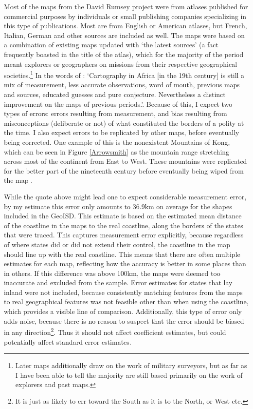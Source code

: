\documentclass[12pt]{article}
\begin{document}
Most of the maps from the David Rumsey project were from atlases published
for commercial purposes by individuals or small publishing companies
specializing in this type of publications. Most are from English or American
atlases, but French, Italian, German and other sources are included as well. The
maps were based on a combination of existing maps updated with `the latest
sources' (a fact frequently boasted in the title of the atlas), which for the
majority of the period meant explorers or geographers on missions from their
respective geographical societies.\footnote{Later maps additionally draw on the
	work of military surveyors, but as far as I have been able to tell the
majority are still based primarily on the work of explorers and past maps.} In
the words of \citet[47-48]{Stone1995}: `Cartography in Africa [in the 19th
century] is still a mix of measurement, less accurate observations, word of
mouth, previous maps and sources, educated guesses and pure conjecture.
Nevertheless a distinct improvement on the maps of previous periods.'. Because
of this, I expect two types of errors: errors resulting from measurement, and
bias resulting from misconceptions (deliberate or not) of what constituted the
borders of a polity at the time. I also expect errors to be replicated by other
maps, before eventually being corrected. One example of this is the nonexistent
Mountains of Kong, which can be seen in Figure \ref{Arrowsmith} as the mountain
range stretching across most of the continent from East to West. These mountains
were replicated for the better part of the nineteenth century before
eventually being wiped from the map \citep{Bassett_1991}.

While the quote above might lead one to expect considerable measurement error,
by my estimate this error only amounts to 36.9km on average for the shapes
included in the GeoISD. This estimate is based on the estimated mean distance of
the coastline in the maps to the real coastline, along the borders of the states
that were traced. This captures measurement error explicitly, because regardless
of where states did or did not extend their control, the coastline in the map
should line up with the real coastline. This means that there are often multiple
estimates for each map, reflecting how the accuracy is better in some places
than in others. If this difference was above 100km, the maps were deemed too
inaccurate and excluded from the sample. Error estimates for states that lay
inland were not included, because consistently matching features from the maps
to real geographical features was not feasible other than when using the
coastline, which provides a visible line of comparison. Additionally, this type
of error only adds noise, because there is no reason to suspect that the error
should be biased in any direction\footnote{It is just as likely to err toward
the South as it is to the North, or West etc.}. Thus it should not affect
coefficient estimates, but could potentially affect standard error estimates.
\end{document}
